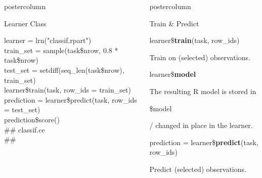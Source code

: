 \documentclass{beamer}
\newlength{\columnheight} %
\newcommand{\codeinline}[1]{\begin{codeboxinline}#1\end{codeboxinline}}
\begin{document}
\begin{frame}[fragile]{}
\begin{columns}
\begin{column}{.245\textwidth}
\begin{beamercolorbox}[center]{postercolumn}
\begin{minipage}{.98\textwidth}
{\begin{myblock}{Learner Class}
\begin{codeboxexample}
{									learner = lrn("classif.rpart")
									\vspace{1em}
									\\
									train\_set = sample(task\$nrow, 0.8 * task\$nrow)\\
									test\_set = setdiff(seq\_len(task\$nrow), train\_set)
									\vspace{1em}
									\\
									learner\$train(task, row\_ids = train\_set)
									\vspace{1em}
									\\
									prediction = learner\$predict(task, row\_ids = test\_set)\\
									prediction\$score()\\
									\#\# classif.ce\\
									\#\# }
							\end{codeboxexample}
						\end{myblock}
					\vfill}
				\end{minipage}
			\end{beamercolorbox}
		\end{column}
		\begin{column}{.245\textwidth}
			\begin{beamercolorbox}[center]{postercolumn}
				\begin{minipage}{.98\textwidth}
					\parbox[t][\columnheight]{\textwidth}{
						\begin{myblock}{Train \& Predict}
							\begin{codebox}
								learner\$\textbf{train}(task, row\_ids)
							\end{codebox}
	                        Train on (selected) observations. 
	   						\\
							\begin{codebox}
								learner\$\textbf{model}
							\end{codebox}
							The resulting R model is stored in \codeinline{\$model}/ changed in place in the learner.
							\\
							\vspace{1em} %
							\begin{codebox}
								prediction = learner\$\textbf{predict}(task, row\_ids)
							\end{codebox}
	                        Predict (selected) observations.
	                        \\
	                        \begin{codeboxmultiline}[width=23cm]

\end{codeboxmultiline}
\end{myblock}}
\end{minipage}
\end{beamercolorbox}
\end{column}
\end{columns}
\end{frame}
\end{document}
